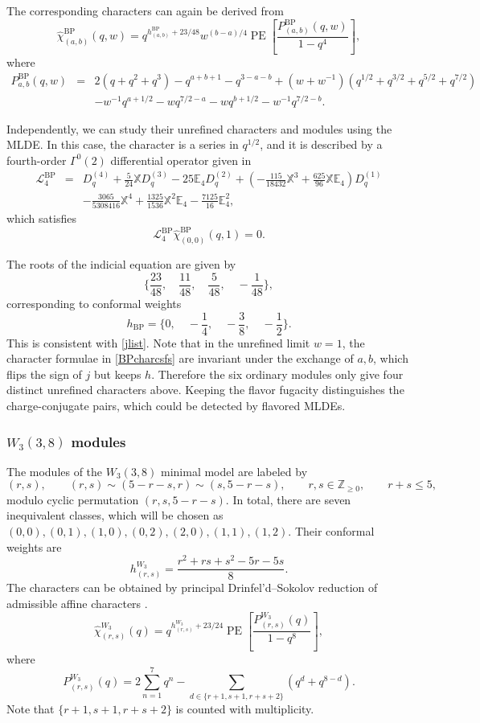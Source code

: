 \documentclass[a4paper,11pt]{article}
\theoremstyle{definition}
\theoremstyle{definition}
\theoremstyle{remark}
\newcommand{\be}{\begin{equation}}
\newcommand{\ee}{\end{equation}}
\newcommand{\beqn}{\begin{eqnarray}}
\newcommand{\eeqn}{\end{eqnarray}}
\begin{document}
 
 

 The corresponding characters can again  be derived from \cite{KacWakimotoBoundary2017}     
 \be \label{BPcharcsfs}
 {\widehat\chi}^{ \text{BP}}_{(a,b)}(q,w)
=
q^{h^{ \text{BP}}_{(a,b)}+23/48}w^{(b-a)/4}
\operatorname{PE}\left[
\frac{P^{ \text{BP}}_{(a,b)}(q,w)}{1-q^4}
\right], 
\ee 
where
 \beqn
P^{ \text{BP}}_{a,b}(q,w) &=& 2(q+q^2+q^3)-q^{a+b+1}-q^{3-a-b} +(w+w^{-1})(q^{1/2}+q^{3/2}+q^{5/2}+q^{7/2})
\nonumber\\
&& -w^{-1}q^{a+1/2}-wq^{7/2-a} -wq^{b+1/2}-w^{-1}q^{7/2-b}.
\eeqn 
 
Independently, we can study their unrefined characters and    modules using the MLDE. In this case, the character is a series in $q^{1/2}$, and  it is  described by a fourth-order $\Gamma^0(2)$ differential operator given  in~\cite{Beem:2017ooy}
%
 \beqn\label{BPMLD}
\mathscr L_4^{\mathrm{BP}}&=&D_q^{(4)}
+\frac5{24}\mathbb{X}D_q^{(3)}-25\mathbb{E}_4D_q^{(2)}
+\left(-\frac{115}{18432}\mathbb{X}^3
+\frac{625}{96}\mathbb{X}\mathbb{E}_4\right)D_q^{(1)}
\nonumber\\
&&
-\frac{3065}{5308416}\mathbb{X}^4
+\frac{1325}{1536}\mathbb{X}^2\mathbb{E}_4
-\frac{7125}{16}\mathbb{E}_4^2,
\eeqn 
which satisfies
\be
\mathscr{L}^{ \text{BP}}_4   {\widehat\chi}^{ \text{BP}}_{(0,0)}(q,1)=0.
\ee

The roots of the indicial equation are given by 
\be 
\Big\{
\frac{23}{48},\quad
\frac{11}{48},\quad
\frac5{48},\quad
-\frac1{48} 
\Big\},
\ee
corresponding to conformal weights 
\be\label{hBP}
h_{ \text{BP}}=\Big\{ 0,\quad-\frac14,\quad-\frac38,\quad-\frac12 \Big\}.
\ee
 This is consistent with \eqref{jlist}. Note that in the unrefined limit  $w=1$, the character formulae in \eqref{BPcharcsfs} are invariant under the exchange of $a,b$, which flips the sign of $j$ but keeps $h$. Therefore the six ordinary modules only give four distinct unrefined characters above. Keeping the flavor fugacity distinguishes the charge-conjugate pairs, which could be detected by flavored MLDEs.
   
\subsubsection{$W_3(3,8)$  modules}
The modules of the $ W_3(3,8)$ minimal model are labeled by
  \be 
(r,s), \qquad (r,s)\sim(5-r-s,r)\sim(s,5-r-s),\qquad r,s\in\mathbb Z_{\geq0}, \qquad r+s\leq5,
\ee 
modulo cyclic permutation $(r,s,5-r-s)$.
In total, there are seven inequivalent classes, which will be chosen as  $(0,0),(0,1),(1,0),(0,2),(2,0),(1,1),(1,2)$.  Their conformal weights are
\be 
h^{W_3}_{(r,s)}
=
\frac{r^2+rs+s^2-5r-5s}{8}.
\ee
 The characters can be obtained by principal Drinfel'd--Sokolov reduction of admissible affine characters \cite{FrenkelKacWakimoto1992,KacWakimotoBoundary2017}. 
\be 
\widehat\chi^ {W_3}_{(r,s)}(q)
=
q^{h^{W_3}_ {(r,s)}+23/24}
\operatorname{PE}\left[
\frac{P^{W_3}_{(r,s)}(q)}{1-q^8}
\right],
\ee
where
\be 
P^{W_3}_{(r,s)}(q)
=
2\sum_{n=1}^{7}q^n
-
\sum_{d\in\{r+1,s+1,r+s+2\}}
\left(q^d+q^{8-d}\right).
\ee
Note that  $\{r+1,s+1,r+s+2\}$ is counted with multiplicity.  
\end{document}
